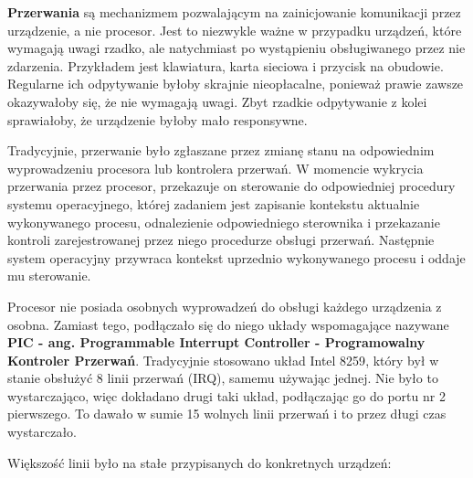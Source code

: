 \documentclass[shortabstract,inz]{iithesis}
\begin{document}
\textbf{Przerwania} są mechanizmem pozwalającym na zainicjowanie komunikacji przez urządzenie, a nie procesor. 
Jest to niezwykle ważne w przypadku urządzeń, które wymagają uwagi rzadko, ale natychmiast po 
wystąpieniu obsługiwanego przez nie zdarzenia.
Przykładem jest klawiatura, karta sieciowa i przycisk na obudowie. Regularne ich odpytywanie 
byłoby skrajnie nieopłacalne, ponieważ prawie zawsze okazywałoby się, że nie wymagają uwagi. 
Zbyt rzadkie odpytywanie z kolei sprawiałoby, że urządzenie byłoby mało responsywne.

Tradycyjnie, przerwanie było zgłaszane przez zmianę stanu na odpowiednim wyprowadzeniu 
procesora lub kontrolera przerwań. W momencie wykrycia przerwania przez procesor, przekazuje on sterowanie do odpowiedniej 
procedury systemu operacyjnego, której zadaniem jest zapisanie kontekstu aktualnie wykonywanego procesu, 
odnalezienie odpowiedniego sterownika i przekazanie kontroli zarejestrowanej przez niego procedurze obsługi przerwań. 
Następnie system operacyjny przywraca kontekst uprzednio wykonywanego procesu i oddaje mu sterowanie.

Procesor nie posiada osobnych wyprowadzeń do obsługi każdego urządzenia z
osobna. Zamiast tego, podłączało się do niego układy wspomagające nazywane \textbf{PIC
- ang. Programmable Interrupt Controller - Programowalny Kontroler Przerwań}. Tradycyjnie
 stosowano układ Intel 8259\cite{8259a}, który był w stanie
obsłużyć 8 linii przerwań (IRQ), samemu używając jednej. Nie było to wystarczająco,
więc dokładano drugi taki układ, podłączając go do portu nr 2 pierwszego. 
To dawało w sumie 15 wolnych linii przerwań i to przez długi czas wystarczało.


Większość linii było na stałe przypisanych do konkretnych urządzeń:
\end{document}
